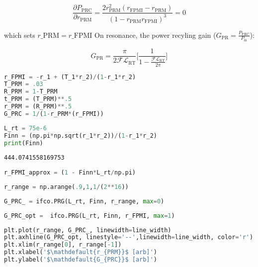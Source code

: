 \[\frac{\partial P_\mathrm{PRC}}{\partial r_\mathrm{PRM}} = \frac{2r_\mathrm{PRM}^2(r_\mathrm{FPMI} - r_\mathrm{PRM})}{(1 - r_\mathrm{PRM} r_\mathrm{FPMI})^3} = 0\]

which sets $ r\_\mathrm{PRM} = r\_\mathrm{FPMI} $ On resonance, the
power recyling gain
(\(G_\mathrm{PR} = \frac{P_\mathrm{PRC}}{P_\mathrm{in}}\)):

\[ G_\mathrm{PR} = \frac{\pi}{2 \mathcal{F} \mathscr{L}_\mathrm{RT}} \Bigg[ \frac{1}{1- \frac{\mathcal{F}\mathscr{L}_\mathrm{RT}}{2 \pi}} \Bigg] \]

\begin{lstlisting}[frame=single, language=Python]
r_FPMI = -r_1 + (T_1*r_2)/(1-r_1*r_2)
T_PRM = .03
R_PRM = 1-T_PRM
t_PRM = (T_PRM)**.5
r_PRM = (R_PRM)**.5
G_PRC = 1/(1-r_PRM*(r_FPMI))
\end{lstlisting}

\begin{lstlisting}[frame=single, language=Python]
L_rt = 75e-6
Finn = (np.pi*np.sqrt(r_1*r_2))/(1-r_1*r_2)
print(Finn)
\end{lstlisting}

\begin{lstlisting}
444.0741558169753
\end{lstlisting}

\begin{lstlisting}[frame=single, language=Python]
r_FPMI_approx = (1 - Finn*L_rt/np.pi)
\end{lstlisting}

\begin{lstlisting}[frame=single, language=Python]
r_range = np.arange(.9,1,1/(2**16))
\end{lstlisting}

\begin{lstlisting}[frame=single, language=Python]
G_PRC_ = ifco.PRG(L_rt, Finn, r_range, max=0) 
\end{lstlisting}

\begin{lstlisting}[frame=single, language=Python]
G_PRC_opt =  ifco.PRG(L_rt, Finn, r_FPMI, max=1)
\end{lstlisting}

\begin{lstlisting}[frame=single, language=Python]
plt.plot(r_range, G_PRC_, linewidth=line_width)
plt.axhline(G_PRC_opt, linestyle='--',linewidth=line_width, color='r')
plt.xlim(r_range[0], r_range[-1])
plt.xlabel('$\mathdefault{r_{PRM}}$ [arb]')
plt.ylabel('$\mathdefault{G_{PRC}}$ [arb]')
\end{lstlisting}

